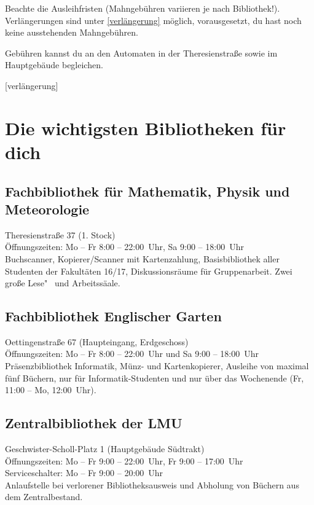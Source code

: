 Beachte die Ausleihfristen (Mahngebühren variieren je nach Bibliothek!). 
Verlängerungen sind unter \ref{verlängerung}
möglich, vorausgesetzt, du hast noch keine ausstehenden Mahngebühren.

Gebühren kannst du an den Automaten in der Theresienstraße sowie
im Hauptgebäude begleichen.

\begin{urlList}
	[verlängerung]
\end{urlList}

\section{Die wichtigsten Bibliotheken für dich}

\subsection*{Fachbibliothek für Mathematik, Physik und Meteorologie\subjectList{\subjectM\subjectW\subjectP}}
Theresienstraße 37 (1. Stock)\\
Öffnungszeiten: Mo -- Fr 8:00 -- 22:00~Uhr, Sa 9:00 -- 18:00~Uhr\\
Buchscanner, Kopierer/Scanner mit Kartenzahlung, Basisbibliothek aller
Studenten der Fakultäten 16/17, Diskussionsräume für Gruppenarbeit.
Zwei große Lese"~ und Arbeitssäale.

\subsection*{Fachbibliothek Englischer Garten\subjectList{\subjectI\subjectMI}}
Oettingenstraße 67 (Haupteingang, Erdgeschoss)\\
Öffnungszeiten: Mo -- Fr 8:00 -- 22:00~Uhr und Sa 9:00 -- 18:00~Uhr\\
Präsenzbibliothek Informatik, Münz- und Kartenkopierer, Ausleihe von maximal fünf Büchern, nur für Informatik-Studenten und nur über das Wochenende (Fr, 11:00 -- Mo, 12:00~Uhr).

\subsection*{Zentralbibliothek der LMU}
Geschwister-Scholl-Platz 1 (Hauptgebäude Südtrakt)\\
Öffnungszeiten: Mo -- Fr 9:00 -- 22:00~Uhr, Fr 9:00 -- 17:00~Uhr\\
Serviceschalter: Mo -- Fr 9:00 -- 20:00~Uhr\\
Anlaufstelle bei verlorener Bibliotheksausweis und Abholung von Büchern aus dem Zentralbestand.

